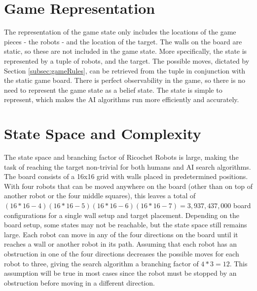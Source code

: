\documentclass[a4paper,10pt]{article}
\begin{document}


\section{Game Representation}
\label{sec:gameRep}
The representation of the game state only includes the locations of the game pieces - the robots - and the location of the target. The walls on the board are static,
so these are not included in the game state. More specifically, the state is represented by a tuple of robots, and the target. The possible moves, dictated by Section
\ref{subsec:gameRules}, can be retrieved from the tuple in conjunction with the static game board. There is perfect observability in the game, so there is no need to represent
the game state as a belief state. The state is simple to represent, which makes the AI algorithms run more efficiently and accurately.


\section{State Space and Complexity}
\label{sec:stateSpace}
The state space and branching factor of Ricochet Robots is large, making the task of reaching the target non-trivial for both humans and AI search algorithms.
The board consists of a 16x16 grid with walls placed in predetermined positions.  With four robots that can be moved anywhere on the board (other
than on top of another robot or the four middle squares), this leaves a total of $(16*16-4)(16*16-5)(16*16-6)(16*16-7) = 3,937,437,000$ board configurations for a single wall setup and
target placement.  Depending on the board setup, some states may not be reachable, but the state space still remains large. Each robot can move in any of the
four directions on the board until it reaches a wall or another robot in its path.  Assuming that each robot has an obstruction in one of the four directions
decreases the possible moves for each robot to three, giving the search algorithm a branching factor of $4*3 = 12$.  This assumption will be true in most cases since
the robot must be stopped by an obstruction before moving in a different direction. \\
\end{document}
